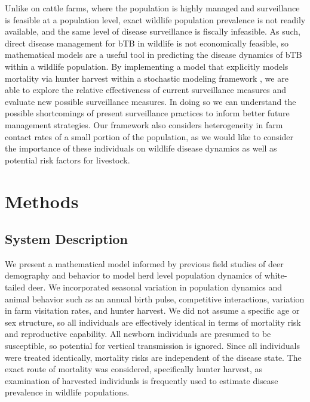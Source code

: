 \documentclass[number,preprint,review,12pt]{elsarticle}
\begin{document}
Unlike on cattle farms, where the population is highly managed and surveillance is feasible at a population level, exact wildlife population prevalence is not readily available, and the same level of disease surveillance is fiscally infeasible. As such, direct disease management for bTB in wildlife is not economically feasible, so mathematical models are a useful tool in predicting the disease dynamics of bTB within a wildlife population. By implementing a model that explicitly models mortality via hunter harvest within a stochastic modeling framework \citet{SANDMANN}, we are able to explore the relative effectiveness of current surveillance measures and evaluate new possible surveillance measures. In doing so we can understand the possible shortcomings of present surveillance practices to inform better future management strategies. Our framework also considers heterogeneity in farm contact rates of a small portion of the population, as we would like to consider the importance of these individuals on wildlife disease dynamics as well as potential risk factors for livestock. 

\section{Methods}
\doublespacing
\subsection{System Description}
\doublespacing
We present a mathematical model informed by previous field studies of deer demography and behavior to model herd level population dynamics of white-tailed deer. We incorporated seasonal variation in population dynamics and animal behavior such as an annual birth pulse, competitive interactions, variation in farm visitation rates, and hunter harvest. We did not assume a specific age or sex structure, so all individuals are effectively identical in terms of mortality risk and reproductive capability. All newborn individuals are presumed to be susceptible, so potential for vertical transmission is ignored. Since all individuals were treated identically, mortality risks are independent of the disease state. The exact route of mortality was considered, specifically hunter harvest, as examination of harvested individuals is frequently used to estimate disease prevalence in wildlife populations.
\end{document}
